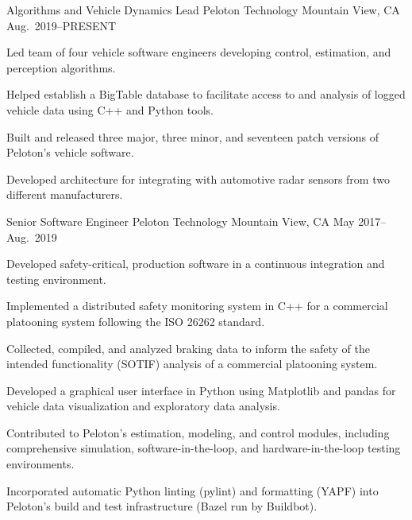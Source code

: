 \begin{cventries}
  \cventry%
    {Algorithms and Vehicle Dynamics Lead}
    {Peloton Technology}
    {Mountain View, CA}
    {Aug.\ 2019--PRESENT}
    {%
      \begin{cvitems}
        \item{Led team of four vehicle software engineers developing control, estimation, and perception algorithms.}
        \item{Helped establish a BigTable database to facilitate access to and analysis of logged vehicle data using C++ and Python tools.}
        \item{Built and released three major, three minor, and seventeen patch versions of Peloton's vehicle software.}
        \item{Developed architecture for integrating with automotive radar sensors from two different manufacturers.}
      \end{cvitems}
    }

  \cventry%
    {Senior Software Engineer}
    {Peloton Technology}
    {Mountain View, CA}
    {May 2017--Aug.\ 2019}
    {%
      \begin{cvitems}
        \item{Developed safety-critical, production software in a continuous integration and testing environment.}
        \item{Implemented a distributed safety monitoring system in C++ for a commercial platooning system following the ISO 26262 standard.}
        \item{Collected, compiled, and analyzed braking data to inform the safety of the intended functionality (SOTIF) analysis of a commercial platooning system.}
        \item{Developed a graphical user interface in Python using Matplotlib and pandas for vehicle data visualization and exploratory data analysis.}
        \item{Contributed to Peloton's estimation, modeling, and control modules, including comprehensive simulation, software-in-the-loop, and hardware-in-the-loop testing environments.}
        \item{Incorporated automatic Python linting (pylint) and formatting (YAPF) into Peloton's build and test infrastructure (Bazel run by Buildbot).}
      \end{cvitems}
    }


\end{cventries}
